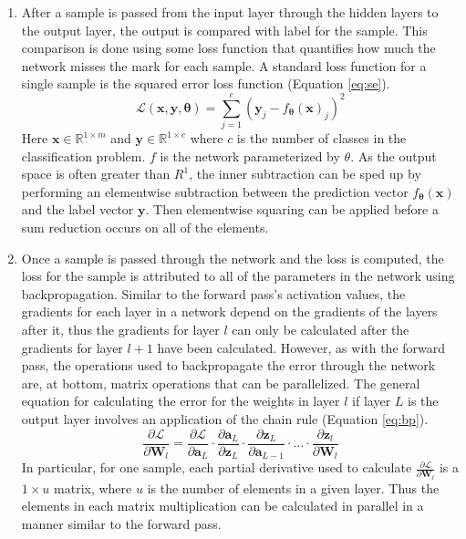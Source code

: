 \documentclass[11pt,a4paper]{article}
\begin{document}
\begin{enumerate}
    \item After a sample is passed from the input layer through the hidden layers to the output layer, the output is compared with label for the sample. This comparison is done using some loss function that quantifies how much the network misses the mark for each sample. A standard loss function for a single sample is the squared error loss function (Equation \ref{eq:se}).
    \begin{equation} \label{eq:se}
        \mathcal{L}(\bm{x}, \bm{y}, \bm{\theta}) = \sum_{j=1}^{c}(\bm{y}_j - f_{\bm{\theta}}(\bm{x})_j)^2
    \end{equation} Here $\bm{x} \in \mathbb{R}^{1 \times m}$ and  $\bm{y} \in \mathbb{R}^{1 \times c}$ where $c$ is the number of classes in the classification problem. $f$ is the network parameterized by $\theta$. As the output space is often greater than $R^1$, the inner subtraction can be sped up by performing an elementwise subtraction between the prediction vector $f_{\bm{\theta}}(\bm{x})$ and the label vector $\bm{y}$. Then elementwise squaring can be applied before a sum reduction occurs on all of the elements.
    
    \item Once a sample is passed through the network and the loss is computed, the loss for the sample is attributed to all of the parameters in the network using backpropagation. Similar to the forward pass's activation values, the gradients for each layer in a network depend on the gradients of the layers after it, thus the gradients for layer $l$ can only be calculated after the gradients for layer $l+1$ have been calculated. However, as with the forward pass, the operations used to backpropagate the error through the network are, at bottom, matrix operations that can be parallelized. The general equation for calculating the error for the weights in layer $l$ if layer $L$ is the output layer involves an application of the chain rule (Equation \ref{eq:bp}).
    \begin{equation} \label{eq:bp}
        \frac{\partial \mathcal{L}}{\partial \bm{W}_l} = \frac{\partial \mathcal{L}}{\partial \bm{a}_L} \cdot 
        \frac{\partial \bm{a}_L}{\partial \bm{z}_L} \cdot 
        \frac{\partial \bm{z}_L}{\partial \bm{a}_{L-1}} \cdot \ldots \cdot
        \frac{\partial \bm{z}_l}{\partial \bm{W}_l}
    \end{equation}
    In particular, for one sample, each partial derivative used to calculate $\frac{\partial \mathcal{L}}{\partial \bm{W}_l}$ is a $1 \times u$ matrix, where $u$ is the number of elements in a given layer. Thus the elements in each matrix multiplication can be calculated in parallel in a manner similar to the forward pass. 
    

\end{enumerate}
\end{document}

